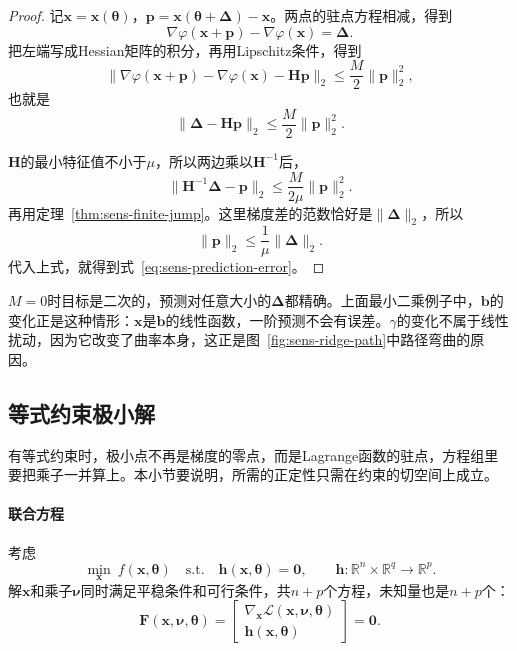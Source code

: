 \begin{proof}
记$\bm{x}=\bm{x}(\bm{\theta})$，$\bm{p}=\bm{x}(\bm{\theta}+\bm{\Delta})-\bm{x}$。两点的驻点方程相减，得到
\[
 \nabla\varphi(\bm{x}+\bm{p})-\nabla\varphi(\bm{x})=\bm{\Delta}.
\]
把左端写成Hessian矩阵的积分，再用Lipschitz条件，得到
\[
 \bigl\lVert\nabla\varphi(\bm{x}+\bm{p})-\nabla\varphi(\bm{x})-\bm{H}\bm{p}\bigr\rVert_2\leq\frac{M}{2}\lVert\bm{p}\rVert_2^2,
\]
也就是
\[
 \lVert\bm{\Delta}-\bm{H}\bm{p}\rVert_2\leq\frac{M}{2}\lVert\bm{p}\rVert_2^2.
\]

$\bm{H}$的最小特征值不小于$\mu$，所以两边乘以$\bm{H}^{-1}$后，
\[
 \lVert\bm{H}^{-1}\bm{\Delta}-\bm{p}\rVert_2\leq\frac{M}{2\mu}\lVert\bm{p}\rVert_2^2.
\]
再用定理~\ref{thm:sens-finite-jump}。这里梯度差的范数恰好是$\lVert\bm{\Delta}\rVert_2$，所以
\[
 \lVert\bm{p}\rVert_2\leq\frac{1}{\mu}\lVert\bm{\Delta}\rVert_2.
\]
代入上式，就得到式~\eqref{eq:sens-prediction-error}。
\end{proof}

$M=0$时目标是二次的，预测对任意大小的$\bm{\Delta}$都精确。上面最小二乘例子中，$\bm{b}$的变化正是这种情形：$\bm{x}$是$\bm{b}$的线性函数，一阶预测不会有误差。$\gamma$的变化不属于线性扰动，因为它改变了曲率本身，这正是图~\ref{fig:sens-ridge-path}中路径弯曲的原因。

\subsection{等式约束极小解}
\label{sec:sens-equality}

有等式约束时，极小点不再是梯度的零点，而是Lagrange函数的驻点，方程组里要把乘子一并算上。本小节要说明，所需的正定性只需在约束的切空间上成立。

\paragraph{联合方程}
考虑
\[
 \min_{\bm{x}}\ f(\bm{x},\bm{\theta})\quad\text{s.t.}\quad\bm{h}(\bm{x},\bm{\theta})=\bm{0},\qquad\bm{h}:\mathbb{R}^n\times\mathbb{R}^q\to\mathbb{R}^p.
\]
解$\bm{x}$和乘子$\bm{\nu}$同时满足平稳条件和可行条件，共$n+p$个方程，未知量也是$n+p$个：
\begin{equation}
 \bm{F}(\bm{x},\bm{\nu},\bm{\theta})=\begin{bmatrix}\nabla_{\bm{x}}\mathcal{L}(\bm{x},\bm{\nu},\bm{\theta})\\\bm{h}(\bm{x},\bm{\theta})\end{bmatrix}=\bm{0}.
 \label{eq:sens-kkt-equation}
\end{equation}

